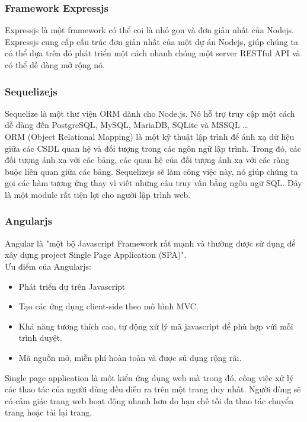 \documentclass[a4paper,12pt,oneside]{article}
\begin{document}
\subsubsection{Framework Expressjs}
\noindent Expressjs là một framework có thể coi là nhỏ gọn và đơn giản nhất của Nodejs. Expressjs cung cấp cấu trúc đơn giản nhất của một dự án Nodejs, giúp chúng ta có thể dựa trên đó phát triển một cách nhanh chóng một server RESTful API và có thể dễ dàng mở rộng nó.

\subsubsection{Sequelizejs}
\noindent Sequelize là một thư viện ORM dành cho Node.js. Nó hỗ trợ truy cập một cách dễ dàng đến PostgreSQL, MySQL, MariaDB, SQLite và MSSQL  …\\
 ORM (Object Relational Mapping) là một kỹ thuật lập trình để ánh xạ dữ liệu giữa các CSDL quan hệ và đối tượng trong các ngôn ngữ lập trình. Trong đó, các đối tượng ánh xạ với các bảng, các quan hệ của đối tượng ánh xạ với các ràng buộc liên quan giữa các bảng. Sequelizejs sẽ làm công việc này, nó giúp chúng ta gọi các hàm tương ứng thay vì viết những câu truy vấn bằng ngôn ngữ SQL. Đây là một module rất tiện lợi cho người lập trình web.
 
\subsubsection{Angularjs}
\noindent Angular là "một bộ Javascript Framework rất mạnh và thường được sử dụng để xây dựng project Single Page Application (SPA)"\cite{angular}.\\
Ưu điểm của Angularjs:
\begin{itemize}
	\item Phát triển dự trên Javascript
	\item Tạo các ứng dụng client-side theo mô hình MVC.
	\item Khả năng tương thích cao, tự động xử lý mã javascript để phù hợp vứi mỗi trình duyệt.
	\item Mã nguồn mở, miễn phí hoàn toàn và được sủ dụng rộng rãi.
\end{itemize}

\noindent Single page application là một kiểu ứng dụng web mà trong đó, công việc xử lý các thao tác của người dùng đều diễn ra trên một trang duy nhất. Người dùng sẽ có cảm giác trang web hoạt động nhanh hơn do hạn chế tối đa thao tác chuyển trang hoặc tải lại trang.
\end{document}
